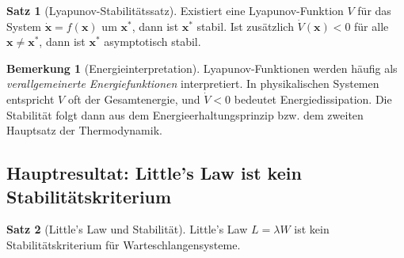 ﻿\documentclass[a4paper,12pt]{scrreprt}
\theoremstyle{definition}
\newtheorem{bemerkung}{Bemerkung}[section]
\newtheorem{satz}{Satz}[section]
\begin{document}
\begin{satz}[Lyapunov-Stabilitätssatz]
	Existiert eine Lyapunov-Funktion $V$ für das System $\dot{\mathbf{x}} = f(\mathbf{x})$ um $\mathbf{x}^*$, dann ist $\mathbf{x}^*$ stabil. Ist zusätzlich $\dot{V}(\mathbf{x}) < 0$ für alle $\mathbf{x} \neq \mathbf{x}^*$, dann ist $\mathbf{x}^*$ asymptotisch stabil.
\end{satz}

\begin{bemerkung}[Energieinterpretation]
	Lyapunov-Funktionen werden häufig als \textit{verallgemeinerte Energiefunktionen} interpretiert. In physikalischen Systemen entspricht $V$ oft der Gesamtenergie, und $\dot{V} < 0$ bedeutet Energiedissipation. Die Stabilität folgt dann aus dem Energieerhaltungsprinzip bzw. dem zweiten Hauptsatz der Thermodynamik.
\end{bemerkung}

\subsection{Hauptresultat: Little's Law ist kein Stabilitätskriterium}

\begin{satz}[Little's Law und Stabilität]
	Little's Law $L = \lambda W$ ist kein Stabilitätskriterium für Warteschlangensysteme.
\end{satz}
\end{document}
